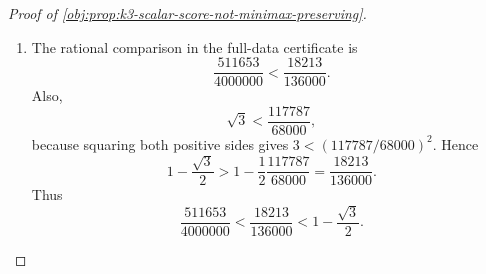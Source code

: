 \documentclass[11pt]{article}
\begin{document}
\begin{proof}[Proof of \cref{obj:prop:k3-scalar-score-not-minimax-preserving}]
\begin{enumerate}
\[
\Xi(000,111,111)=0,
\]
so no smaller constant than \(511653/4000000\) works for this estimator.
Since \(\Xi\ge0\) on all of \((\{0,1\}^3)^3\),
\[
R_F(z)\le \frac{511653}{4000000}
\qquad\text{for every }z\in\mathcal T_3^3 .
\]
For the schedule with response types \((0,0,0),(1,1,1),(1,1,1)\), the target is \(0\), and the same finite sum reduces to
\[
\begin{aligned}
R_F(z)
&=\frac18\left(\frac{183}{1000}\right)^2
+\frac18\left(\frac{638}{1000}\right)^2
+\frac14\left(\frac{199}{1000}\right)^2
+\frac14\left(\frac{167}{1000}\right)^2  \\
&\qquad
+\frac18\left(\frac{648}{1000}\right)^2
+\frac18\left(\frac{167}{1000}\right)^2
=\frac{511653}{4000000}.
\end{aligned}
\]
Therefore the worst-case risk of this full-data rule is exactly \(511653/4000000\). %

\item
The rational comparison in the full-data certificate is
\[
\frac{511653}{4000000}<\frac{18213}{136000}.
\]
Also,
\[
\sqrt3<\frac{117787}{68000},
\]
because squaring both positive sides gives \(3<(117787/68000)^2\). Hence
\[
1-\frac{\sqrt3}{2}
>
1-\frac1{2}\frac{117787}{68000}
=
\frac{18213}{136000}.
\]
Thus
\[
\frac{511653}{4000000}
<
\frac{18213}{136000}
<
1-\frac{\sqrt3}{2}.
\]


\end{enumerate}
\end{proof}
\end{document}
